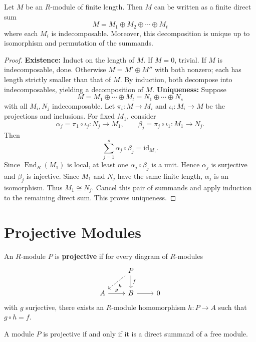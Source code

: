 \begin{thm}
Let $M$ be an $R$-module of finite length. Then $M$ can be written as a finite direct sum
\[
M = M_1 \oplus M_2 \oplus \cdots \oplus M_t
\]
where each $M_i$ is indecomposable. Moreover, this decomposition is unique up to isomorphism and permutation of the summands.
\end{thm}

\begin{proof}
\textbf{Existence:} Induct on the length of $M$. If $M = 0$, trivial. If $M$ is indecomposable, done. Otherwise $M = M' \oplus M''$ with both nonzero; each has length strictly smaller than that of $M$. By induction, both decompose into indecomposables, yielding a decomposition of $M$.
\textbf{Uniqueness:} Suppose
\[
M=M_1\oplus\cdots\oplus M_t=N_1\oplus\cdots\oplus N_s
\]
with all \(M_i,N_j\) indecomposable. Let \(\pi_i:M\to M_i\) and \(\iota_i:M_i\to M\) be the projections and inclusions. For fixed \(M_1\), consider
\[
\alpha_j=\pi_1\circ \iota_j:N_j\to M_1, \qquad \beta_j=\pi_j\circ \iota_1:M_1\to N_j.
\]
Then
\[
\sum_{j=1}^s \alpha_j \circ \beta_j = \mathrm{id}_{M_1}.
\]
Since \(\operatorname{End}_R(M_1)\) is local, at least one \(\alpha_j \circ \beta_j\) is a unit. Hence \(\alpha_j\) is surjective and \(\beta_j\) is injective. Since \(M_1\) and \(N_j\) have the same finite length, \(\alpha_j\) is an isomorphism. Thus \(M_1\cong N_j\). Cancel this pair of summands and apply induction to the remaining direct sum. This proves uniqueness.
\end{proof}

\section{Projective Modules}

\begin{defn}
An \(R\)-module \(P\) is \textbf{projective} if for every diagram of \(R\)-modules
\[
\begin{tikzcd}
    & P \arrow[d, "f"] \arrow[ld, dashed, "h"] & \\
    A \arrow[r, "g"] & B \arrow[r] & 0
\end{tikzcd}
\]
with \(g\) surjective, there exists an \(R\)-module homomorphism \(h: P \to A\) such that \(g \circ h = f\).
\end{defn}

\begin{prop}
A module $P$ is projective if and only if it is a direct summand of a free module.
\end{prop}


